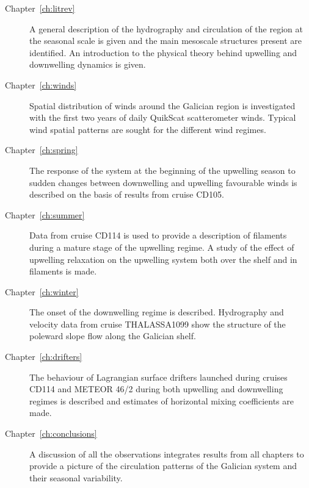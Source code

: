 \begin{description}
  \item[Chapter~\ref{ch:litrev}] A general description of the hydrography and
  circulation of the region at the seasonal scale is given and
  the main mesoscale structures present are identified. An
  introduction to the physical theory behind upwelling and downwelling
  dynamics is given.
  \item[Chapter~\ref{ch:winds}] Spatial distribution of winds around the
  Galician region is investigated with the first two years of
  daily QuikScat scatterometer winds. Typical wind spatial
  patterns are sought for the different wind regimes.
  \item[Chapter~\ref{ch:spring}] The response of the system at the
  beginning of the upwelling season to sudden changes between
  downwelling and upwelling favourable winds is described on the
  basis of results from cruise CD105.
  \item[Chapter~\ref{ch:summer}] Data from cruise CD114 is used to provide
  a description of filaments during a mature
  stage of the upwelling regime. A study of the effect of
  upwelling relaxation on the upwelling system both over the shelf
  and in filaments is made.
  \item[Chapter~\ref{ch:winter}] The onset of the downwelling
  regime is described. Hydrography and velocity data from cruise THALASSA1099 show the structure of the
  poleward slope flow along the Galician shelf.
  \item[Chapter~\ref{ch:drifters}] The behaviour of Lagrangian surface
  drifters launched during cruises CD114 and METEOR 46/2
  during both upwelling and downwelling regimes is described and
  estimates of horizontal mixing coefficients are made.
  \item[Chapter~\ref{ch:conclusions}] A discussion of all the observations integrates
  results from all chapters to provide a picture of the
  circulation patterns of the Galician system and their seasonal variability.

\end{description}
